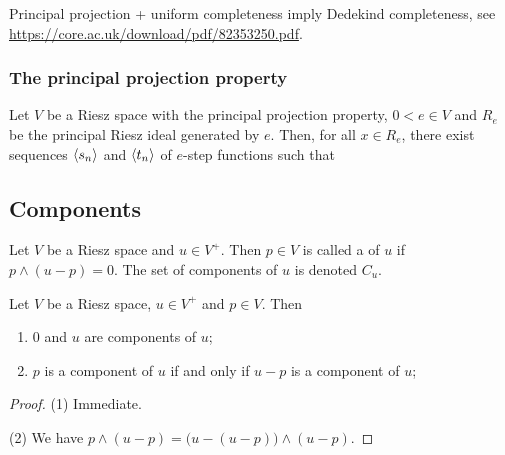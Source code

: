 Principal projection + uniform completeness imply Dedekind completeness, see \url{https://core.ac.uk/download/pdf/82353250.pdf}.

\subsubsection{The principal projection property}

\begin{theorem}
Let $V$ be a Riesz space with the principal projection property, $0 < e \in V$ and $R_e$ be the principal Riesz ideal generated by $e$. Then, for all $x\in R_e$, there exist sequences $\left\langle s_n \right\rangle$ and $\left\langle t_n \right\rangle$ of $e$-step functions such that
\end{theorem}

\subsection{Components}
\begin{definition}
Let $V$ be a Riesz space and $u\in V^+$. Then $p\in V$ is called a  of $u$ if $p\wedge (u-p) = 0$. The set of components of $u$ is denoted $C_u$.
\end{definition}

\begin{lemma} \label{RieszComponentsLemma}
Let $V$ be a Riesz space, $u\in V^+$ and $p\in V$. Then
\begin{enumerate}
\item $0$ and $u$ are components of $u$;
\item $p$ is a component of $u$ \textup{if and only if} $u-p$ is a component of $u$;
\end{enumerate}
\end{lemma}
\begin{proof}
(1) Immediate.

(2) We have $p\wedge (u-p) = \big(u - (u-p)\big)\wedge (u-p)$.
\end{proof}


